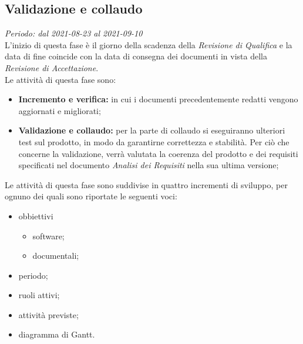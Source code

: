 \subsection{Validazione e collaudo}
\textit{Periodo: dal 2021-08-23 al 2021-09-10}\\
L'inizio di questa fase è il giorno della scadenza della \textit{Revisione di Qualifica} e la data di fine coincide con la data di consegna dei documenti in vista della \textit{Revisione di Accettazione}.\\
Le attività di questa fase sono:
\begin{itemize}
    \item \textbf{Incremento e verifica:} in cui i documenti precedentemente redatti vengono aggiornati e migliorati;
    \item \textbf{Validazione e collaudo:} per la parte di collaudo si eseguiranno ulteriori test sul prodotto, in modo da garantirne correttezza e stabilità. Per ciò che concerne la validazione, verrà valutata la coerenza del prodotto e dei requisiti specificati nel documento \textit{Analisi dei Requisiti} nella sua ultima versione;
\end{itemize}
Le attività di questa fase sono suddivise in quattro incrementi di sviluppo, per ognuno dei quali sono riportate le seguenti voci:
\begin{itemize}
    \item obbiettivi
          \begin{itemize}
              \item software;
              \item documentali;
          \end{itemize}
    \item periodo;
    \item ruoli attivi;
    \item attività previste;
    \item diagramma di Gantt.
\end{itemize}

